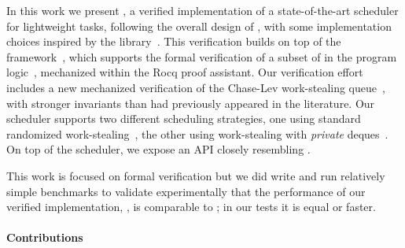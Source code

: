 In this work we present \Parabs, a verified implementation of a state-of-the-art scheduler for lightweight tasks, following the overall design of \Domainslib, with some implementation choices inspired by the \Taskflow \Cpp library~\citep{DBLP:journals/tpds/HuangLLL22}.
This verification builds on top of the \Zoo framework~\citep{AllainS26}, which supports the formal verification of a subset of \OCamlFive in the \Iris program logic~\citep{DBLP:journals/jfp/JungKJBBD18}, mechanized within the Rocq proof assistant.
Our verification effort includes a new mechanized verification of the Chase-Lev work-stealing queue~\citep{DBLP:conf/spaa/ChaseL05}, with stronger invariants than had previously appeared in the literature.
Our scheduler supports two different scheduling strategies, one using standard randomized work-stealing~\citep{DBLP:journals/jacm/BlumofeL99}, the other using work-stealing with \emph{private} deques~\citep{DBLP:conf/ppopp/AcarCR13}.
On top of the scheduler, we expose an API closely resembling \Domainslib.%

This work is focused on formal verification but we did write and run relatively simple benchmarks to validate experimentally that the performance of our verified implementation, \Parabs, is comparable to \Domainslib; in our tests it is equal or faster.

\paragraph{Contributions}

